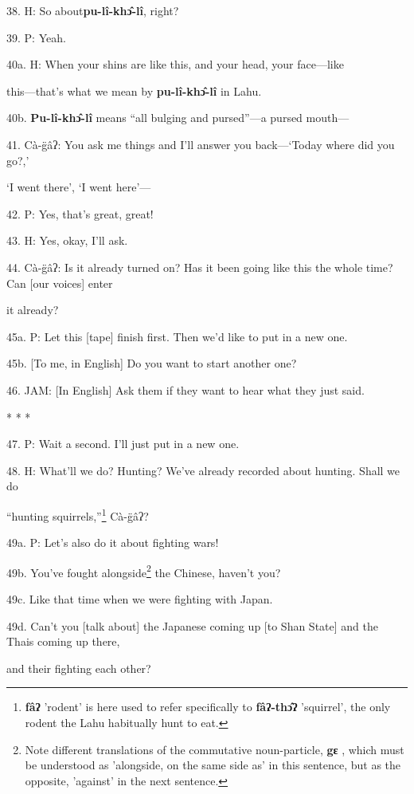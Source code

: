 38. H: So about\textbf{pu-lî-khɔ̂-lî}, right?

39. P: Yeah.

40a. H:  When your shins are like
this, and your head, your face---like

this---that's what we mean by \textbf{pu-lî-khɔ̂-lî} in Lahu.


40b. \textbf{Pu-lî-khɔ̂-lî} means ``all bulging and pursed''---a pursed mouth---

41. Cà-g̈âʔ: You ask me things and I'll answer you back---`Today where did
you go?,'

`I went there', `I went here'---

42. P: Yes, that's great, great!

43. H: Yes, okay, I'll ask.

44. Cà-g̈âʔ: Is it already turned on? Has it been going like this the whole
time? Can [our voices] enter

it already?

45a. P: Let this [tape] finish first. Then we'd like to put in a new one.

45b. [To me, in English] Do you want to start another one?

46. JAM: [In English] Ask them if they want to hear what they just said.

* * *

47. P: Wait a second. I'll just put in a new one.

48. H: What'll we do? Hunting? We've already recorded about hunting. Shall we do


``hunting squirrels,''\footnote{\textbf{fâʔ} 'rodent' is here used to refer specifically to \textbf{fâʔ-thɔ̂ʔ} 'squirrel', the only rodent the Lahu habitually hunt to eat.} Cà-g̈âʔ?

49a. P: Let's also do it about fighting wars!

49b. You've fought alongside\footnote{Note different translations of the commutative noun-particle, \textbf{gɛ} , which must be understood as 'alongside, on the same side as' in this sentence, but as the opposite, 'against' in the next sentence.} the Chinese, haven't you?

49c. Like that time when we were fighting with Japan.

49d. Can't you [talk about] the Japanese coming up [to Shan State] and the Thais
coming up there,

and their fighting each other?

